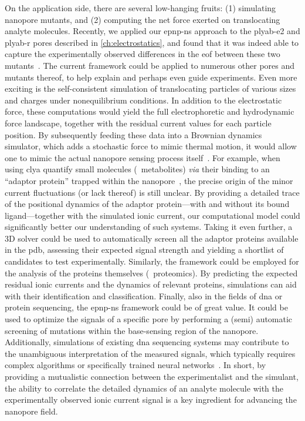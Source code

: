 On the application side, there are several low-hanging fruits: (1) simulating nanopore mutants, and (2)
computing the net force exerted on translocating analyte molecules. Recently, we applied our \gls{epnp-ns}
approach to the \gls{plyab-e2} and \gls{plyab-r} pores described in \cref{ch:electrostatics}, and found that
it was indeed able to capture the experimentally observed differences in the \gls{eof} between these two
mutants~\cite{Huang-2020}. The current framework could be applied to numerous other pores and mutants thereof,
to help explain and perhaps even guide experiments. Even more exciting is the self-consistent simulation of
translocating particles of various sizes and charges under nonequilibrium conditions. In addition to the
electrostatic force, these computations would yield the full electrophoretic and hydrodynamic force landscape,
together with the residual current values for each particle position. By subsequently feeding these
data into a Brownian dynamics simulator, which adds a stochastic force to mimic thermal motion, it
would allow one to mimic the actual nanopore sensing process itself~\cite{Pederson-2015,Hulings-2018}. For
example, when using \gls{clya} quantify small molecules (\eg~metabolites) \textit{via} their binding to an
``adaptor protein'' trapped within the nanopore~\cite{Zernia-2020}, the precise origin of the minor current
fluctuations (or lack thereof) is still unclear. By providing a detailed trace of the positional dynamics of
the adaptor protein---with and without its bound ligand---together with the simulated ionic current, our
computational model could significantly better our understanding of such systems. Taking it even further, a 3D
solver could be used to automatically screen all the adaptor proteins available in the \gls{pdb}, assessing
their expected signal strength and yielding a shortlist of candidates to test experimentally. Similarly, the
framework could be employed for the analysis of the proteins themselves (\ie~proteomics). By predicting the
expected residual ionic currents and the dynamics of relevant proteins, simulations can aid with their
identification and classification. Finally, also in the fields of \gls{dna} or protein sequencing, the
\gls{epnp-ns} framework could be of great value. It could be used to optimize the signals of a specific pore
by performing a (semi) automatic screening of mutations within the base-sensing region of the nanopore.
Additionally, simulations of existing \gls{dna} sequencing systems may contribute to the unambiguous
interpretation of the measured signals, which typically requires complex algorithms or specifically trained
neural networks~\cite{Wick-2019}. In short, by providing a mutualistic connection between the experimentalist
and the simulant, the ability to correlate the detailed dynamics of an analyte molecule with the
experimentally observed ionic current signal is a key ingredient for advancing the nanopore field.



\cleardoublepage

